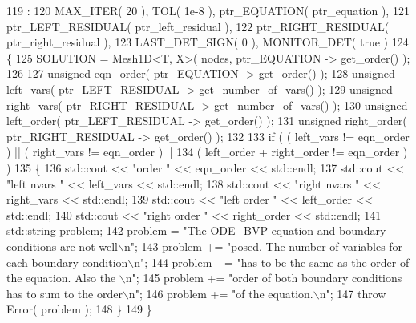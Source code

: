 \begin{DoxyCode}
119                                              :
120            MAX\_ITER( 20 ), TOL( 1e-8 ), ptr\_EQUATION( ptr\_equation ),
121            ptr\_LEFT\_RESIDUAL( ptr\_left\_residual ),
122            ptr\_RIGHT\_RESIDUAL( ptr\_right\_residual ),
123            LAST\_DET\_SIGN( 0 ), MONITOR\_DET( \textcolor{keyword}{true} )
124   \{
125     SOLUTION = Mesh1D<T, X>( nodes, ptr\_EQUATION -> get\_order() );
126 
127     \textcolor{keywordtype}{unsigned} eqn\_order( ptr\_EQUATION -> get\_order() );
128     \textcolor{keywordtype}{unsigned} left\_vars( ptr\_LEFT\_RESIDUAL -> get\_number\_of\_vars() );
129     \textcolor{keywordtype}{unsigned} right\_vars( ptr\_RIGHT\_RESIDUAL -> get\_number\_of\_vars() );
130     \textcolor{keywordtype}{unsigned} left\_order( ptr\_LEFT\_RESIDUAL -> get\_order() );
131     \textcolor{keywordtype}{unsigned} right\_order( ptr\_RIGHT\_RESIDUAL -> get\_order() );
132 
133     \textcolor{keywordflow}{if} ( ( left\_vars != eqn\_order ) || ( right\_vars != eqn\_order ) ||
134          ( left\_order + right\_order != eqn\_order ) )
135     \{
136      std::cout << \textcolor{stringliteral}{"order "} << eqn\_order << std::endl;
137      std::cout << \textcolor{stringliteral}{"left nvars "} << left\_vars << std::endl;
138      std::cout << \textcolor{stringliteral}{"right nvars "} << right\_vars << std::endl;
139      std::cout << \textcolor{stringliteral}{"left order "} << left\_order << std::endl;
140      std::cout << \textcolor{stringliteral}{"right order "} << right\_order << std::endl;
141      std::string problem;
142      problem  = \textcolor{stringliteral}{"The ODE\_BVP equation and boundary conditions are not well\(\backslash\)n"};
143      problem += \textcolor{stringliteral}{"posed. The number of variables for each boundary condition\(\backslash\)n"};
144      problem += \textcolor{stringliteral}{"has to be the same as the order of the equation. Also the \(\backslash\)n"};
145      problem += \textcolor{stringliteral}{"order of both boundary conditions has to sum to the order\(\backslash\)n"};
146      problem += \textcolor{stringliteral}{"of the equation.\(\backslash\)n"};
147      \textcolor{keywordflow}{throw} Error( problem );
148     \}
149   \}
\end{DoxyCode}
\mbox{\label{classLuna_1_1ODE__BVP_af4ad8cb4bd83a9e41c02bbcf8d28022e}} 
